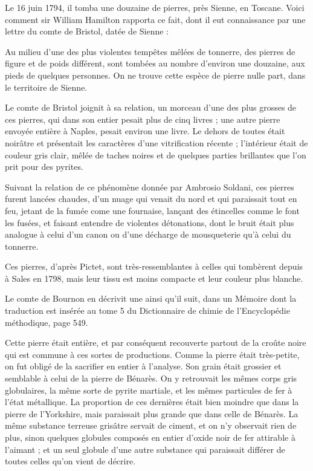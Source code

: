 \documentclass[a4paper, 12pt, oneside, french]{article}
\begin{document}
Le 16 juin 1794, il tomba une douzaine de pierres, près Sienne, en Toscane. Voici comment sir William Hamilton rapporta ce fait, dont il eut connaissance par une lettre du comte de Bristol, datée de Sienne :

\og Au milieu d'une des plus violentes tempêtes mêlées de tonnerre, des pierres de figure et de poids différent, sont tombées au nombre d'environ une douzaine, aux pieds de quelques personnes. On ne trouve cette espèce de pierre nulle part, dans le territoire de Sienne. \fg

Le comte de Bristol joignit à sa relation, un morceau d'une des plus grosses de ces pierres, qui dans son entier pesait plus de cinq livres ; une autre pierre envoyée entière à Naples, pesait environ une livre. Le dehors de toutes était noirâtre et présentait les caractères d'une vitrification récente ; l'intérieur était de couleur gris clair, mêlée de taches noires et de quelques parties brillantes que l'on prit pour des pyrites.

Suivant la relation de ce phénomène donnée par Ambrosio Soldani, ces pierres furent lancées chaudes, d'un nuage qui venait du nord et qui paraissait tout en feu, jetant de la fumée come une fournaise, lançant des étincelles comme le font les fusées, et faisant entendre de violentes détonations, dont le bruit était plus analogue à celui d'un canon ou d'une décharge de mousqueterie qu'à celui du tonnerre.

Ces pierres, d'après Pictet, sont très-ressemblantes à celles qui tombèrent depuis à Sales en 1798, mais leur tissu est moins compacte et leur couleur plus blanche.

Le comte de Bournon en décrivit une ainsi qu'il suit, dans un Mémoire dont la traduction est insérée au tome 5 du Dictionnaire de chimie de l'Encyclopédie méthodique, page 549.

Cette pierre était entière, et par conséquent recouverte partout de la croûte noire qui est commune à ces sortes de productions. Comme la pierre était très-petite, on fut obligé de la sacrifier en entier à l'analyse. Son grain était grossier et semblable à celui de la pierre de Bénarès. On y retrouvait les mêmes corps gris globulaires, la même sorte de pyrite martiale, et les mêmes particules de fer à l'état métallique. La proportion de ces dernières était bien moindre que dans la pierre de l'Yorkshire, mais paraissait plus grande que dans celle de Bénarès. La même substance terreuse grisâtre servait de ciment, et on n'y observait rien de plus, sinon quelques globules composés en entier d'oxide noir de fer attirable à l'aimant ; et un seul globule d'une autre substance qui paraissait différer de toutes celles qu'on vient de décrire.
\end{document}
